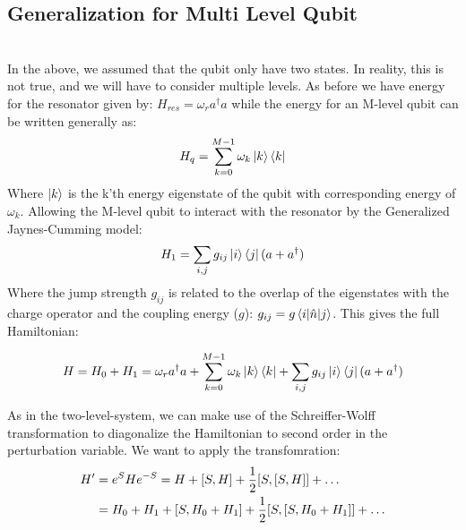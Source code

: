 \subsection{Generalization for Multi Level Qubit}
\\
In the above, we assumed that the qubit only have two states. In reality, this is not true, and we will have to consider multiple levels. As before we have energy for the resonator given by: $H_{res} = \omega_r a^\dagger a$ while the energy for an M-level qubit can be written generally as:
\begin{equation}
    H_{q} = \sum_{k = 0}^{M-1} \omega_k \ket{k}\bra{k}
\end{equation}
Where $\ket{k}$ is the k'th energy eigenstate of the qubit with corresponding energy of $\omega_k$. Allowing the M-level qubit to interact with the resonator by the Generalized Jaynes-Cumming model:
\begin{equation}
    H_1 =  \sum_{i,j} g_{ij} \ket{i}\bra{j} (a + a^\dagger ) 
\end{equation}
Where the jump strength $g_{ij}$ is related to the overlap of the eigenstates with the charge operator and the coupling energy ($g$): $g_{ij} = g \matrixel{i}{\hat{n}}{j}$. This gives the full Hamiltonian: 
\begin{fullwidth}
    \begin{equation}
        H = H_0 + H_1  = \omega_r a^\dagger a +  \sum_{k = 0}^{M-1} \omega_k \ket{k}\bra{k} + \sum_{i,j} g_{ij} \ket{i}\bra{j} (a + a^\dagger ) 
    \end{equation}
\end{fullwidth}
As in the two-level-system, we can make  use of the Schreiffer-Wolff transformation to diagonalize the Hamiltonian to second order in the perturbation variable. We want to apply the transfomration: 
\begin{align}
    H' &= e^{S} H e^{-S} = H + \comm{S}{H} + \frac{1}{2}\comm{S}{\comm{S}{H}} + \dots \nonumber\\
                        &= H_0 + H_1 + \comm{S}{H_0 + H_1} + \frac{1}{2} \comm{S}{\comm{S}{H_0 + H_1}} + \dots
\end{align}
